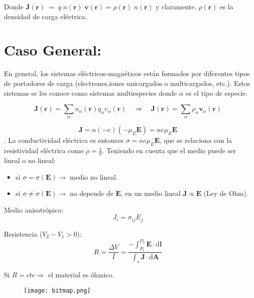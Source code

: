 \documentclass[11pt,fleqn]{book}
\renewcommand{\vec}[1]{\mathbf{#1}}
\begin{document}
Donde $\vec{J}(\vec{r})\;=\;q\;n(\vec{r})\;\vec{v}(\vec{r})=\rho(\vec{r})\;n(\vec{r})$  y claramente, $\rho(\vec{r})$ es la densidad de carga eléctrica.

\section*{Caso General:}

En general, los sistemas eléctricos-magnéticos están formados por diferentes tipos de portadores de carga (electrones,iones unicargados o multicargados, etc.). Estos sistemas se les conoce como sistemas multiespecies donde $\alpha$ es el tipo de especie.

\begin{equation*}
    \vec{J}(\vec{r})=\sum_{\alpha}n_{\alpha}(\vec{r})q_{\alpha}v_{\alpha}(\vec{r})\quad \Longrightarrow \quad \vec{J}(\vec{r})=\sum_{\alpha}\rho_{\alpha}\vec{v}_{\alpha}(\vec{r})
\end{equation*}{}

\headrule

$$\vec{J}=n(-e)(-\mu_{E}\vec{E})=ne\mu_{E}\vec{E}$$. La conductividad eléctrica es entonces $\sigma=ne\mu_{E}\vec{E}$, que se relaciona con la resistividad eléctrica como $\rho=\frac{1}{\sigma}$. Teniendo en cuenta que el medio puede ser lineal o no lineal:

\begin{itemize}
    \item si $\sigma=\sigma(\vec{E}) \longrightarrow$ medio no lineal.
    \item si $\sigma\neq\sigma(\vec{E}) \longrightarrow$ no depende de $\vec{E}$, en un medio lineal $\vec{J} \propto\vec{E}$ (Ley de Ohm).
\end{itemize}

\begin{definition}
Medio anisotrópico:
\begin{equation*}
    J_{i}=\sigma_{ij}E_{j}
\end{equation*}
\end{definition}

\begin{minipage}[b]{0.5\textwidth}
\begin{definition}
Resistencia ($V_{2}-V_{1}>0$):
\begin{equation*}
    R=\frac{\Delta V}{I}=\frac{-\int_{P_{1}}^{P_{2}} \vec{E} \cdot \mathrm{d}\vec{l}}{\int_{s} \vec{J} \cdot \mathrm{d}\vec{A}}
\end{equation*}

Si $R=cte \Longrightarrow$ el material es óhmico.
\end{definition}
\end{minipage}
\begin{minipage}[b]{0.5\linewidth}
\begin{figure}[H]
    \centering
    \texttt{[image: bitmap.png]}
     \label{bitmap}
\end{figure}
\end{minipage}
\end{document}

